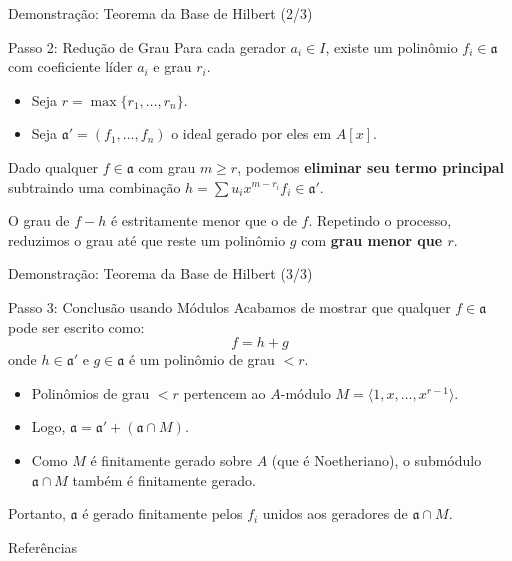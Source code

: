 \documentclass[aspectratio=169]{beamer}
\begin{document}
\begin{frame}{Demonstração: Teorema da Base de Hilbert (2/3)}
	\begin{block}{Passo 2: Redução de Grau}
		Para cada gerador $a_i \in I$, existe um polinômio $f_i \in \mathfrak{a}$ com coeficiente líder $a_i$ e grau $r_i$.
		\begin{itemize}
			\item Seja $r = \max\{r_1, \dots, r_n\}$.
			\item Seja $\mathfrak{a}' = (f_1, \dots, f_n)$ o ideal gerado por eles em $A[x]$.
		\end{itemize}

		\pause
		\vspace{0.3cm}
		Dado qualquer $f \in \mathfrak{a}$ com grau $m \geq r$, podemos \textbf{eliminar seu termo principal} subtraindo uma combinação $h = \sum u_i x^{m-r_i} f_i \in \mathfrak{a}'$.

		\pause
		\vspace{0.3cm}
		O grau de $f - h$ é estritamente menor que o de $f$. Repetindo o processo, reduzimos o grau até que reste um polinômio $g$ com \textbf{grau menor que $r$}.
	\end{block}
\end{frame}

\begin{frame}{Demonstração: Teorema da Base de Hilbert (3/3)}
	\begin{block}{Passo 3: Conclusão usando Módulos}
		Acabamos de mostrar que qualquer $f \in \mathfrak{a}$ pode ser escrito como:
		$$ f = h + g $$
		onde $h \in \mathfrak{a}'$ e $g \in \mathfrak{a}$ é um polinômio de grau $< r$.

		\pause
		\vspace{0.3cm}
		\begin{itemize}
			\item Polinômios de grau $< r$ pertencem ao $A$-módulo $M = \langle 1, x, \dots, x^{r-1} \rangle$.
			\item Logo, $\mathfrak{a} = \mathfrak{a}' + (\mathfrak{a} \cap M)$.
			      \pause
			\item Como $M$ é finitamente gerado sobre $A$ (que é Noetheriano), o submódulo $\mathfrak{a} \cap M$ também é finitamente gerado.
		\end{itemize}

		\pause
		\vspace{0.3cm}
		Portanto, $\mathfrak{a}$ é gerado finitamente pelos $f_i$ unidos aos geradores de $\mathfrak{a} \cap M$.
	\end{block}
\end{frame}

\begin{frame}{Referências}
	\printbibliography
\end{frame}
\end{document}
